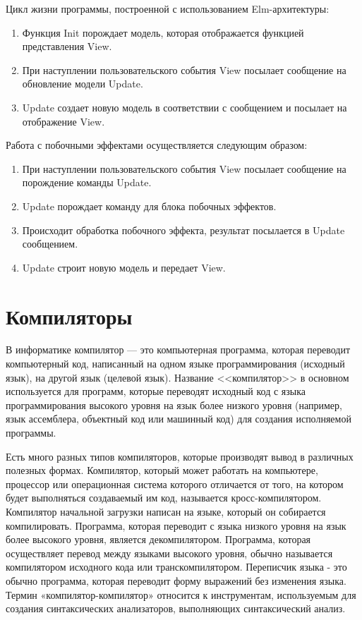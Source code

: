 Цикл жизни программы, построенной с использованием Elm-архитектуры:

\begin{enumerate}
    \item Функция Init порождает модель, которая отображается функцией представления View.
    \item При наступлении пользовательского события View посылает сообщение на обновление модели Update.
    \item Update создает новую модель в соответствии с сообщением и посылает на отображение View.
\end{enumerate}

Работа с побочными эффектами осуществляется следующим образом:

\begin{enumerate}
    \item При наступлении пользовательского события View посылает сообщение на порождение команды Update.
    \item Update порождает команду для блока побочных эффектов.
    \item Происходит обработка побочного эффекта, результат посылается в Update сообщением.
    \item Update строит новую модель и передает View.
\end{enumerate}

\FloatBarrier

\section{Компиляторы}\label{sec:ch1/sec5}

В информатике компилятор --- это компьютерная программа, которая переводит компьютерный код, написанный на одном языке программирования (исходный язык), на другой язык (целевой язык). Название <<компилятор>> в основном используется для программ, которые переводят исходный код с языка программирования высокого уровня на язык более низкого уровня (например, язык ассемблера, объектный код или машинный код) для создания исполняемой программы. 

Есть много разных типов компиляторов, которые производят вывод в различных полезных формах. Компилятор, который может работать на компьютере, процессор или операционная система которого отличается от того, на котором будет выполняться создаваемый им код, называется кросс-компилятором. Компилятор начальной загрузки написан на языке, который он собирается компилировать. Программа, которая переводит с языка низкого уровня на язык более высокого уровня, является декомпилятором. Программа, которая осуществляет перевод между языками высокого уровня, обычно называется компилятором исходного кода или транскомпилятором. Переписчик языка - это обычно программа, которая переводит форму выражений без изменения языка. Термин «компилятор-компилятор» относится к инструментам, используемым для создания синтаксических анализаторов, выполняющих синтаксический анализ.

